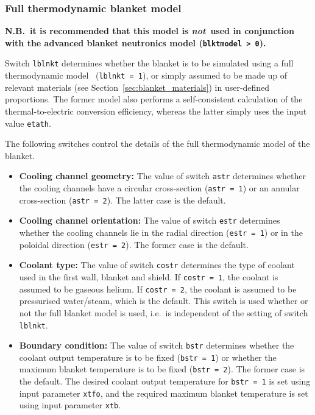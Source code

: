 \documentclass[11pt,a4paper]{report}
\begin{document}
\subsubsection{Full thermodynamic blanket model}
\label{sec:blanket}

\textbf{N.B.\ it is recommended that this model is \textit{not}\ used in
  conjunction with the advanced blanket neutronics model (\texttt{blktmodel >
    0}).}

Switch \texttt{lblnkt} determines whether the blanket is to be simulated using
a full thermodynamic model~\cite{Panos} (\texttt{lblnkt = 1}), or simply
assumed to be made up of relevant materials (see
Section~\ref{sec:blanket_materials}) in user-defined proportions. The former
model also performs a self-consistent calculation of the thermal-to-electric
conversion efficiency, whereas the latter simply uses the input value
\texttt{etath}.

The following switches control the details of the full thermodynamic model of
the blanket.

\begin{itemize}

\item \textbf{Cooling channel geometry:} The value of switch \texttt{astr}
  determines whether the cooling channels have a circular cross-section
  (\texttt{astr = 1}) or an annular cross-section (\texttt{astr = 2}). The
  latter case is the default.

\item \textbf{Cooling channel orientation:} The value of switch \texttt{estr}
  determines whether the cooling channels lie in the radial direction
  (\texttt{estr = 1}) or in the poloidal direction (\texttt{estr = 2}). The
  former case is the default.

\item \textbf{Coolant type:} The value of switch \texttt{costr} determines the
  type of coolant used in the first wall, blanket and shield. If \texttt{costr
    = 1}, the coolant is assumed to be gaseous helium. If \texttt{costr = 2},
  the coolant is assumed to be pressurised water/steam, which is the
  default. This switch is used whether or not the full blanket model is used,
  i.e.\ is independent of the setting of switch \texttt{lblnkt}.

\item \textbf{Boundary condition:} The value of switch \texttt{bstr}
  determines whether the coolant output temperature is to be fixed
  (\texttt{bstr = 1}) or whether the maximum blanket temperature is to be
  fixed (\texttt{bstr = 2}). The former case is the default.  The desired
  coolant output temperature for \texttt{bstr = 1} is set using input
  parameter \texttt{xtfo}, and the required maximum blanket temperature is set
  using input parameter \texttt{xtb}.

\end{itemize}
\end{document}
